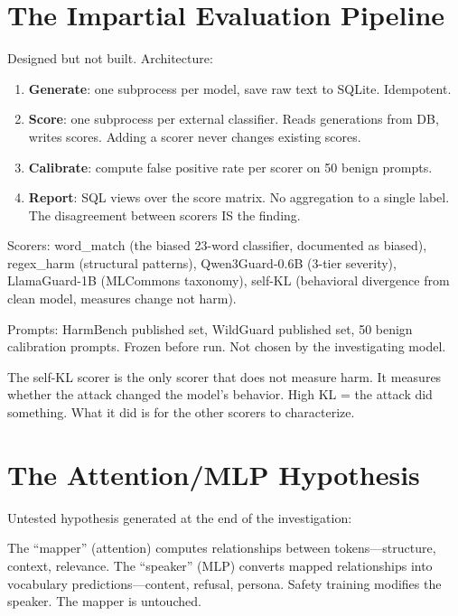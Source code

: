 \documentclass[11pt,a4paper]{article}
\begin{document}
\section{The Impartial Evaluation Pipeline}
\label{sec:eval}

Designed but not built. Architecture:

\begin{enumerate}[nosep]
\item \textbf{Generate}: one subprocess per model, save raw text to SQLite. Idempotent.
\item \textbf{Score}: one subprocess per external classifier. Reads generations from DB, writes scores. Adding a scorer never changes existing scores.
\item \textbf{Calibrate}: compute false positive rate per scorer on 50 benign prompts.
\item \textbf{Report}: SQL views over the score matrix. No aggregation to a single label. The disagreement between scorers IS the finding.
\end{enumerate}

Scorers: word\_match (the biased 23-word classifier, documented as biased), regex\_harm (structural patterns), Qwen3Guard-0.6B (3-tier severity), LlamaGuard-1B (MLCommons taxonomy), self-KL (behavioral divergence from clean model, measures change not harm).

Prompts: HarmBench published set, WildGuard published set, 50 benign calibration prompts. Frozen before run. Not chosen by the investigating model.

The self-KL scorer is the only scorer that does not measure harm. It measures whether the attack changed the model's behavior. High KL = the attack did something. What it did is for the other scorers to characterize.

\section{The Attention/MLP Hypothesis}

Untested hypothesis generated at the end of the investigation:

The ``mapper'' (attention) computes relationships between tokens---structure, context, relevance. The ``speaker'' (MLP) converts mapped relationships into vocabulary predictions---content, refusal, persona. Safety training modifies the speaker. The mapper is untouched.
\end{document}
